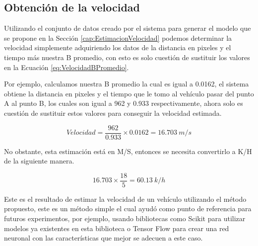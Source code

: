 \subsection{Obtención de la velocidad}

Utilizando el conjunto de datos creado por el sistema para generar el modelo que se propone en la Sección \ref{cap:EstimacionVelocidad} podemos determinar la velocidad simplemente adquiriendo los datos de la distancia en pixeles y el tiempo más nuestra B promedio, con esto es solo cuestión de sustituir los valores en la Ecuación \ref{eq:VelocidadBPromedio}.

Por ejemplo, calculamos nuestra B promedio la cual es igual a 0.0162, el sistema obtiene la distancia en pixeles y el tiempo que le tomo al vehículo pasar del punto A al punto B, los cuales son igual a 962 y 0.933 respectivamente, ahora solo es cuestión de sustituir estos valores para conseguir la velocidad estimada.

\begin{equation}
    \label{eq:EjemploImplementacion}
    Velocidad = \frac{962 }{0.933} \times 0.0162 = 16.703 \: m/s
\end{equation}


No obstante, esta estimación está en M/S, entonces se necesita convertirlo a K/H de la siguiente manera.

\begin{equation}
    \label{eq:EjmploKH}
     16.703\times \frac{18}{5} = 60.13 \: k/h
\end{equation}

Este es el resultado de estimar la velocidad de un vehículo utilizando el método propuesto, este es un método simple el cual ayudó como punto de referencia para futuros experimentos, por ejemplo, usando bibliotecas como Scikit para utilizar modelos ya existentes en esta biblioteca o Tensor Flow para crear una red neuronal con las características que mejor se adecuen a este caso.
